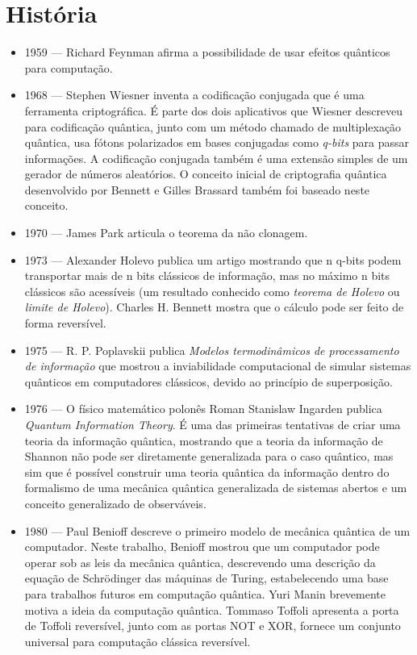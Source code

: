 \documentclass[12pt, a4paper, oneside]{article}
\begin{document}
\section{História}


\begin{itemize}
\item 1959 — Richard Feynman afirma a possibilidade de usar efeitos quânticos para computação.
\item 1968 — Stephen Wiesner inventa a codificação conjugada que é uma ferramenta criptográfica. É parte dos dois aplicativos que Wiesner descreveu para codificação quântica, junto com um método  chamado de multiplexação quântica, usa fótons polarizados em bases conjugadas como \textit{q-bits} para passar informações. A codificação conjugada também é uma extensão simples de um gerador de números aleatórios. O conceito inicial de criptografia quântica desenvolvido por Bennett e Gilles Brassard também foi baseado neste conceito.
\item 1970 — James Park articula o teorema da não clonagem.
\item 1973 — Alexander Holevo publica um artigo mostrando que n q-bits podem transportar mais de n bits clássicos de informação, mas no máximo n bits clássicos são acessíveis (um resultado conhecido como \textit{teorema de Holevo} ou \textit{limite de Holevo}). Charles H. Bennett mostra que o cálculo pode ser feito de forma reversível.
\item 1975 — R. P. Poplavskii publica \textit{Modelos termodinâmicos de processamento de informação} que mostrou a inviabilidade computacional de simular sistemas quânticos em computadores clássicos, devido ao princípio de superposição.
\item 1976 — O físico matemático polonês Roman Stanislaw Ingarden publica \textit{Quantum Information Theory}. É uma das primeiras tentativas de criar uma teoria da informação quântica, mostrando que a teoria da informação de Shannon não pode ser diretamente generalizada para o caso quântico, mas sim que é possível construir uma teoria quântica da informação dentro do formalismo de uma mecânica quântica generalizada de sistemas abertos e um conceito generalizado de observáveis.
\item 1980 — Paul Benioff descreve o primeiro modelo de mecânica quântica de um computador. Neste trabalho, Benioff mostrou que um computador pode operar sob as leis da mecânica quântica, descrevendo uma descrição da equação de Schrödinger das máquinas de Turing, estabelecendo uma base para trabalhos futuros em computação quântica. Yuri Manin brevemente motiva a ideia da computação quântica. Tommaso Toffoli apresenta a porta de Toffoli reversível, junto com as portas NOT e XOR, fornece um conjunto universal para computação clássica reversível.

\end{itemize}
\end{document}
